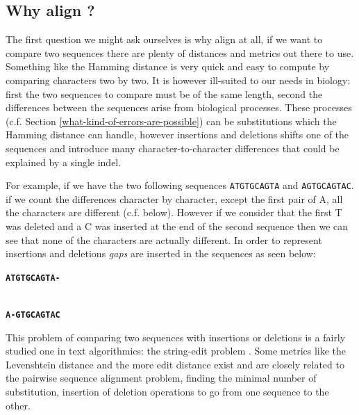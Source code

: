 \documentclass[
  11pt,
  twoside]{scrbook}
\begin{document}
\hypertarget{why-align}{%
\subsection{Why align ?}\label{why-align}}

The first question we might ask ourselves is why align at all, if we want to compare two sequences there are plenty of distances and metrics out there to use. Something like the Hamming distance \autocite{hammingCodingInformationTheory1980} is very quick and easy to compute by comparing characters two by two. It is however ill-suited to our needs in biology: first the two sequences to compare must be of the same length, second the differences between the sequences arise from biological processes. These processes (c.f. Section \ref{what-kind-of-errors-are-possible}) can be substitutions which the Hamming distance can handle, however insertions and deletions shifts one of the sequences and introduce many character-to-character differences that could be explained by a single indel.

For example, if we have the two following sequences \texttt{ATGTGCAGTA} and \texttt{AGTGCAGTAC}. if we count the differences character by character, except the first pair of A, all the characters are different (c.f. below). However if we consider that the first T was deleted and a C was inserted at the end of the second sequence then we can see that none of the characters are actually different. In order to represent insertions and deletions \emph{gaps} are inserted in the sequences as seen below:

\textbf{\texttt{ATGTGCAGTA-}}\strut \\
\textbf{\texttt{A-GTGCAGTAC}}

This problem of comparing two sequences with insertions or deletions is a fairly studied one in text algorithmics: the string-edit problem \autocite{gusfieldAlgorithmsStringsTrees1997}. Some metrics like the Levenshtein distance \autocite{levenshteinBinaryCodesCapable1966} and the more edit distance \autocite{gusfieldAlgorithmsStringsTrees1997} exist and are closely related to the pairwise sequence alignment problem, finding the minimal number of substitution, insertion of deletion operations to go from one sequence to the other.
\end{document}
